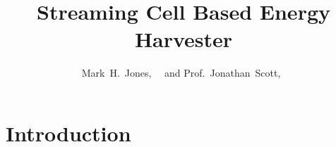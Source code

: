 \documentclass[10pt,final,journal]{IEEEtran}
\title{Streaming Cell Based Energy Harvester}
\author{Mark~H.~Jones,~\IEEEmembership{Student Member,~IEEE,}
~and Prof.~Jonathan~Scott,~\IEEEmembership{Senior Member,~IEEE}}
\begin{document}
    \maketitle

    \begin{abstract}

    \end{abstract}

    \section{Introduction}
\end{document}
